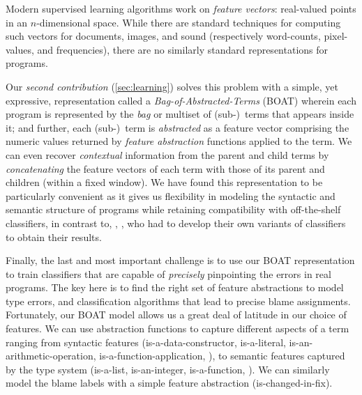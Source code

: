 %
Modern supervised learning algorithms work on %
\emph{feature vectors}: real-valued points in an
$n$-dimensional space. While there are standard
techniques for computing such
vectors for documents, images, and sound (respectively
word-counts, pixel-values, and frequencies),
there are no similarly standard representations for
programs.

Our \emph{second contribution} (\autoref{sec:learning})
solves this problem with a simple, yet expressive, representation called
a \emph{Bag-of-Abstracted-Terms} (BOAT) wherein
each program is represented by the \emph{bag}
or multiset of (sub-)~terms that appears inside
it; and further, each (sub-)~term is \emph{abstracted}
as a feature vector comprising the numeric values
returned by \emph{feature abstraction} functions
applied to the term.
%
%
We can even recover \emph{contextual} information
from the parent and child terms by
\emph{concatenating} the feature vectors of each term
with those of its parent and children
(within a fixed window).
%
We have found this representation to be particularly
convenient as it gives us flexibility in modeling the
syntactic and semantic structure of programs while
retaining compatibility with off-the-shelf classifiers,
in contrast to, \eg, \citet{Raychev2015-jg}, who had
to develop their own variants of classifiers to obtain
their results.

%
Finally, the last and most important challenge is to
use our BOAT representation to train classifiers that
are capable of \emph{precisely} pinpointing the errors
in real programs.
%
The key here is to find the right set of feature
abstractions to model type errors,
and classification algorithms that
lead to precise blame assignments.
%
Fortunately, our BOAT model allows us a great deal of
latitude in our choice of features.
%
We can use abstraction functions to capture different
aspects of a term ranging from
%
syntactic features (\eg is-a-data-constructor, is-a-literal,
is-an-arithmetic-operation, is-a-function-application, \etc),
%
to semantic features captured by the type system (\eg is-a-list,
is-an-integer, is-a-function, \etc).
%
We can similarly model the blame labels with a simple feature
abstraction (\eg is-changed-in-fix).

